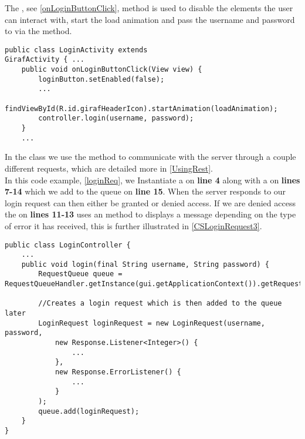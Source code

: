 The , see \autoref{onLoginButtonClick}, method is used
to disable the elements the user can interact with, start the load animation and
pass the username and password to  via the 
method.\nl

\begin{minipage}[H]{\linewidth}
\begin{lstlisting}[caption = Passes the user information and begins the waiting
animation, label = onLoginButtonClick] public class LoginActivity extends
GirafActivity { ...
	public void onLoginButtonClick(View view) {
        loginButton.setEnabled(false);
 		...
        findViewById(R.id.girafHeaderIcon).startAnimation(loadAnimation);
        controller.login(username, password);
    }
	...
\end{lstlisting}
\end{minipage}

In the  class we use the  method to
communicate with the server through a couple different requests, which are
detailed more in \autoref{UsingRest}.\\

In this code example, \autoref{loginReq}, we Instantiate a 
on \textbf{line 4} along with a  on \textbf{lines 7-14}
which we add to the queue on \textbf{line 15}. When the server responds to our
login request can then either be granted or denied access. If we are denied
access the  on \textbf{lines 11-13} uses an
 method to displays a message depending on the type of
error it has received, this is further illustrated in
\autoref{CSLoginRequest3}.\nl

\begin{minipage}[H]{\linewidth}
\begin{lstlisting}[caption = Verifing the user information through a login
request, label = loginReq] public class LoginController {
	...
    public void login(final String username, String password) {
        RequestQueue queue = RequestQueueHandler.getInstance(gui.getApplicationContext()).getRequestQueue();

        //Creates a login request which is then added to the queue later
        LoginRequest loginRequest = new LoginRequest(username, password,
        	new Response.Listener<Integer>() {
        		...
        	},
        	new Response.ErrorListener() {
        		...
        	}
   		);
		queue.add(loginRequest);
	}
}
\end{lstlisting}
\end{minipage}

